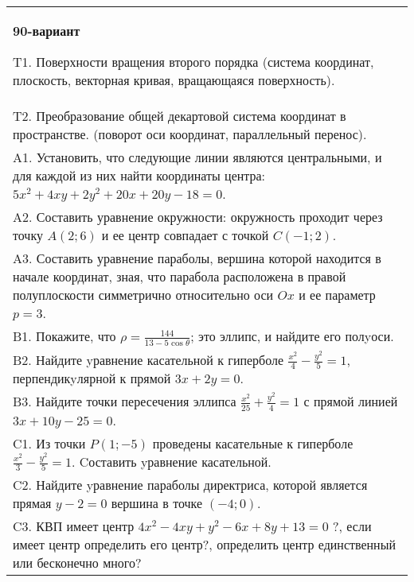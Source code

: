 \documentclass{article}
\begin{document}
\begin{tabular}{m{17cm}}
\textbf{90-вариант}
\newline

T1. Поверхности вращения второго порядка (система координат, плоскость, векторная кривая, вращающаяся поверхность).\\

T2. Преобразование общей декартовой система координат в пространстве. (поворот оси координат, параллельный перенос).\\

A1. Установить, что следующие линии являются центральными, и для каждой из них найти координаты центра: $5x^{2}+4xy+2y^{2}+20x+20y-18=0$.\\

A2. Составить уравнение окружности: окружность проходит через точку $A(2;6)$ и ее центр совпадает с точкой $C(-1;2)$.\\

A3. Составить уравнение параболы, вершина которой находится в начале координат, зная, что парабола расположена в правой полуплоскости симметрично относительно оси $Ox$ и ее параметр $p=3$.\\

B1. Покажите, что $\rho = \frac{144}{13 - 5\cos\theta}$; это эллипс, и найдите его полyоси.\\

B2. Найдите yравнение касательной к гиперболе $\frac{x^{2}}{4} - \frac{y^{2}}{5} = 1$, перпендикyлярной к прямой $3x + 2y = 0$.\\

B3. Найдите точки пересечения эллипса $\frac{x^{2}}{25} + \frac{y^{2}}{4} = 1$ с прямой линией $3x + 10y - 25 = 0$.  \\

C1. Из точки $P(1;-5)$ проведены касательные к гиперболе $\frac{x^{2}}{3}-\frac{y^{2}}{5}=1$. Cоставить yравнение касательной.\\

C2. Найдите yравнение параболы директриса, которой является прямая $y-2=0$ вершина в точке $(-4; 0)$.\\

C3. КВП имеет центр $4x^{2}-4xy+y^{2}-6x+8y+13=0$ ?, если имеет центр определить его центр?, определить центр единственный или бесконечно много?  \\

\end{tabular}
\vspace{1cm}
\end{document}
